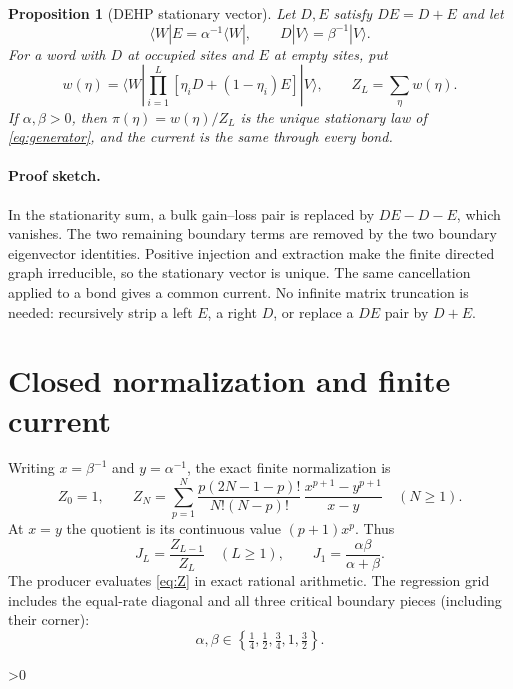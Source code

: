 \documentclass[11pt]{article}
\newtheorem{proposition}[theorem]{Proposition}
\begin{document}
\begin{proposition}[DEHP stationary vector]
\label{prop:dehp}
Let $D,E$ satisfy $DE=D+E$ and let
\[
\langle W|E=\alpha^{-1}\langle W|,\qquad
D|V\rangle=\beta^{-1}|V\rangle .
\]
For a word with $D$ at occupied sites and $E$ at empty sites, put
\[
w(\eta)=\langle W|\prod_{i=1}^{L}
[\eta_iD+(1-\eta_i)E]|V\rangle,\qquad
Z_L=\sum_{\eta}w(\eta).
\]
If $\alpha,\beta>0$, then $\pi(\eta)=w(\eta)/Z_L$ is the unique stationary
law of \eqref{eq:generator}, and the current is the same through every
bond.
\end{proposition}

\paragraph{Proof sketch.}
In the stationarity sum, a bulk gain--loss pair is replaced by $DE-D-E$,
which vanishes.  The two remaining boundary terms are removed by the two
boundary eigenvector identities.  Positive injection and extraction make the
finite directed graph irreducible, so the stationary vector is unique.
The same cancellation applied to a bond gives a common current.
No infinite matrix truncation is needed: recursively strip a left $E$, a
right $D$, or replace a $DE$ pair by $D+E$.

\section{Closed normalization and finite current}
Writing $x=\beta^{-1}$ and $y=\alpha^{-1}$, the exact finite normalization is
\begin{equation}
Z_0=1,\qquad
Z_N=\sum_{p=1}^{N}
\frac{p(2N-1-p)!}{N!(N-p)!}\,
\frac{x^{p+1}-y^{p+1}}{x-y}\quad(N\geq1).
\label{eq:Z}
\end{equation}
At $x=y$ the quotient is its continuous value $(p+1)x^p$.  Thus
\begin{equation}
J_L=\frac{Z_{L-1}}{Z_L}\quad(L\geq1),
\qquad J_1=\frac{\alpha\beta}{\alpha+\beta}.
\label{eq:current}
\end{equation}
The producer evaluates \eqref{eq:Z} in exact rational arithmetic.  The
regression grid includes the equal-rate diagonal and all three critical
boundary pieces (including their corner):
\[
\alpha,\beta\in\left\{\tfrac14,\tfrac12,\tfrac34,1,\tfrac32\right\}.
\]

\ifnum\CRevisionRound>0
\end{document}
